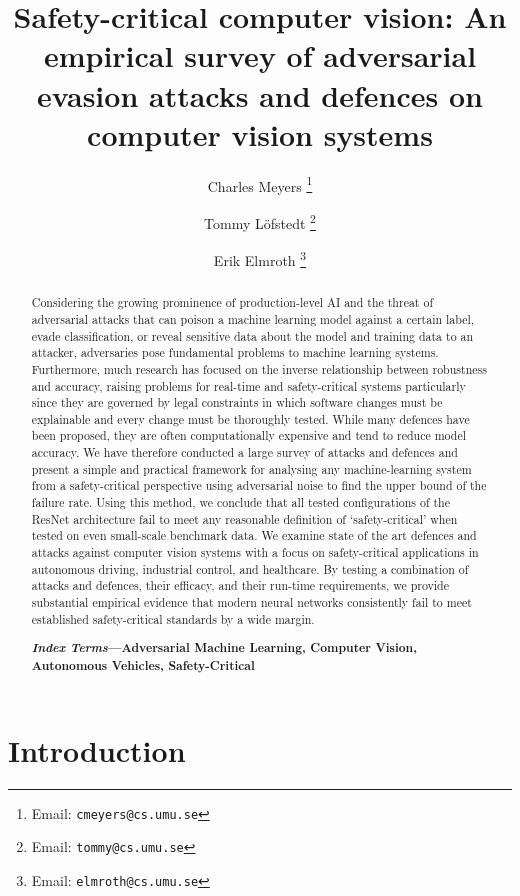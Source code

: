 \documentclass[journal]{IEEEtran}
\title{Safety-critical computer vision: An empirical survey of adversarial evasion attacks and defences on computer vision systems}
\author[1]{Charles Meyers%
  \thanks{Email: \texttt{cmeyers@cs.umu.se}}}
\author[1]{Tommy L\"{o}fstedt%
  \thanks{Email: \texttt{tommy@cs.umu.se}}}
\author[1]{Erik Elmroth%
  \thanks{Email: \texttt{elmroth@cs.umu.se}}}
\affil[1]{Department of Computing Science, Umeå University, Umeå, Sweden}
\begin{document}
\pagestyle{empty}
\maketitle
\begin{abstract}

Considering the growing prominence of production-level AI and the threat of adversarial attacks that can poison a machine learning model against a certain label, evade classification, or reveal sensitive data about the model and training data to an attacker, adversaries pose fundamental problems to machine learning systems.
Furthermore, much research has focused on the inverse relationship between robustness and accuracy, raising problems for real-time and safety-critical systems particularly since they are governed by legal constraints in which software changes must be explainable and every change must be thoroughly tested.
While many defences have been proposed, they are often computationally expensive and tend to reduce model accuracy.
We have therefore conducted a large survey of attacks and defences and present a simple and practical framework for analysing any machine-learning system from a safety-critical perspective using adversarial noise to find the upper bound of the failure rate.
Using this method, we conclude that all tested configurations of the ResNet architecture fail to meet any reasonable definition of `safety-critical' when tested on even small-scale benchmark data.
We examine state of the art defences and attacks against computer vision systems with a focus on safety-critical applications in autonomous driving, industrial control, and healthcare.
By testing a combination of attacks and defences, their efficacy, and their run-time requirements, we provide substantial empirical evidence that modern neural networks consistently fail to meet established safety-critical standards by a wide margin.

\textbf{\textit{Index Terms}---Adversarial Machine Learning, Computer Vision, Autonomous Vehicles, Safety-Critical}

\end{abstract}


\section{Introduction}
\end{document}
